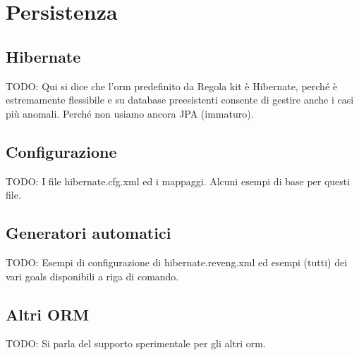 \chapter{Persistenza}\label{chap:persistenza}

\section{Hibernate}
TODO: Qui si dice che l'orm predefinito da Regola kit è Hibernate, perché è estremamente flessibile e su database preesistenti consente di gestire anche i casi più anomali. Perché non usiamo ancora JPA (immaturo).

\section{Configurazione}
TODO: I file hibernate.cfg.xml ed i mappaggi. Alcuni esempi di base per questi file.

\section{Generatori automatici}
TODO: Esempi di configurazione di hibernate.reveng.xml ed esempi (tutti) dei vari goals disponibili a riga di comando.

\section{Altri ORM}
TODO: Si parla del supporto sperimentale per gli altri orm.